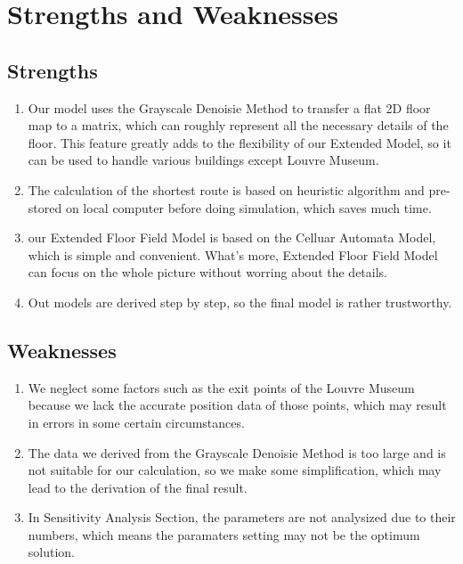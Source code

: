 \documentclass{mcmthesis}
\begin{document}
\section{Strengths and Weaknesses}
\subsection{Strengths}
\begin{enumerate}
	\item Our model uses the Grayscale Denoisie Method to transfer a flat 2D floor map to a matrix, which can roughly represent all the necessary details of the floor. This feature greatly adds to the flexibility of our Extended Model, so it can be used to handle various buildings except Louvre Museum.
	\item The calculation of the shortest route is based on heuristic algorithm and pre-stored on local computer before doing simulation, which saves much time.
	\item our Extended Floor Field Model is based on the Celluar Automata Model, which is simple and convenient. What's more, Extended Floor Field Model can focus on the whole picture without worring about the details.
	\item Out models are derived step by step, so the final model is rather trustworthy.
\end{enumerate}
\subsection{Weaknesses}
\begin{enumerate}
	\item We neglect some factors such as the exit points of the Louvre Museum because we lack the accurate position data of those points, which may result in errors in some certain circumstances. 
	\item The data we derived from the Grayscale Denoisie Method is too large and is not suitable for our calculation, so we make some simplification, which may lead to the derivation of the final result.
	\item In Sensitivity Analysis Section, the parameters are not analysized due to their numbers, which means the paramaters setting may not be the optimum solution. 
\end{enumerate}
\end{document}
